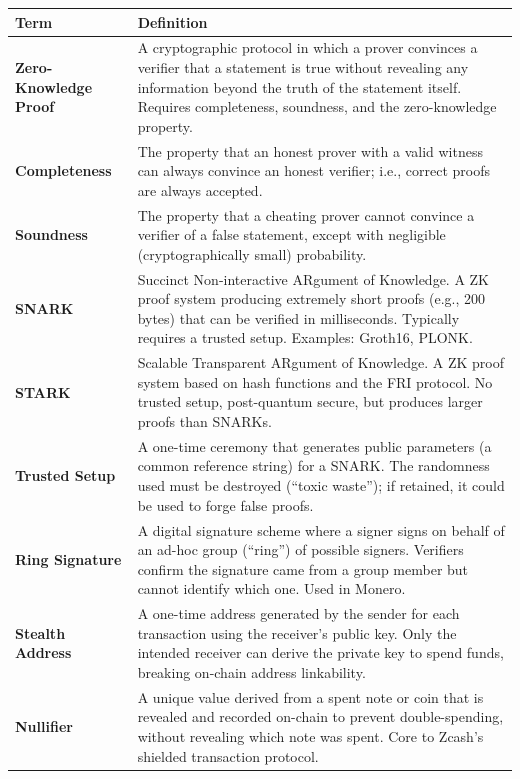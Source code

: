 \documentclass[11pt,a4paper]{article}
\begin{document}
\renewcommand{\arraystretch}{1.25}
\noindent\begin{tabular}{@{}p{3.8cm}p{10.8cm}@{}}
\toprule
\textbf{Term} & \textbf{Definition} \\
\midrule
\textbf{Zero-Knowledge Proof}    & A cryptographic protocol in which a prover convinces a verifier that a statement is true without revealing any information beyond the truth of the statement itself. Requires completeness, soundness, and the zero-knowledge property. \\
\textbf{Completeness}            & The property that an honest prover with a valid witness can always convince an honest verifier; i.e., correct proofs are always accepted. \\
\textbf{Soundness}               & The property that a cheating prover cannot convince a verifier of a false statement, except with negligible (cryptographically small) probability. \\
\textbf{SNARK}                   & Succinct Non-interactive ARgument of Knowledge. A ZK proof system producing extremely short proofs (e.g., 200 bytes) that can be verified in milliseconds. Typically requires a trusted setup. Examples: Groth16, PLONK. \\
\textbf{STARK}                   & Scalable Transparent ARgument of Knowledge. A ZK proof system based on hash functions and the FRI protocol. No trusted setup, post-quantum secure, but produces larger proofs than SNARKs. \\
\textbf{Trusted Setup}           & A one-time ceremony that generates public parameters (a common reference string) for a SNARK. The randomness used must be destroyed (``toxic waste''); if retained, it could be used to forge false proofs. \\
\textbf{Ring Signature}          & A digital signature scheme where a signer signs on behalf of an ad-hoc group (``ring'') of possible signers. Verifiers confirm the signature came from a group member but cannot identify which one. Used in Monero. \\
\textbf{Stealth Address}         & A one-time address generated by the sender for each transaction using the receiver's public key. Only the intended receiver can derive the private key to spend funds, breaking on-chain address linkability. \\
\textbf{Nullifier}               & A unique value derived from a spent note or coin that is revealed and recorded on-chain to prevent double-spending, without revealing which note was spent. Core to Zcash's shielded transaction protocol. \\

\end{tabular}
\end{document}
